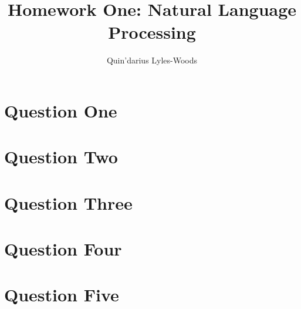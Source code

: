 \documentclass{article}
\title{Homework One: Natural Language Processing}
\author{Quin'darius Lyles-Woods}
\begin{document}
\maketitle
\section{Question One}

\section{Question Two}

\section{Question Three}

\section{Question Four}

\section{Question Five}

\end{document}

